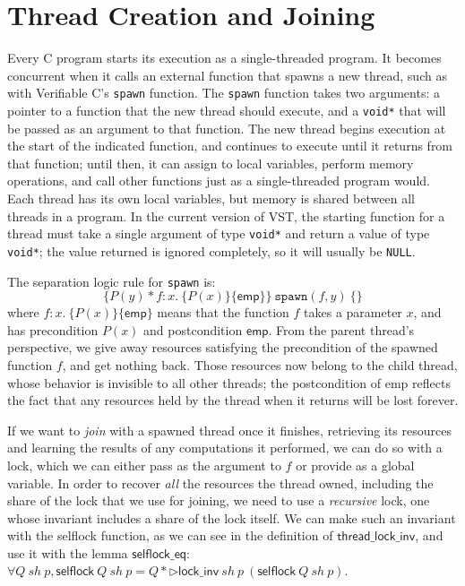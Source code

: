 \documentclass[11pt]{article} %
\begin{document}
\section{Thread Creation and Joining}
Every C program starts its execution as a single-threaded program. It becomes concurrent when it calls an external function that spawns a new thread, such as with Verifiable C's \texttt{spawn} function. The \texttt{spawn} function takes two arguments: a pointer to a function that the new thread should execute, and a \texttt{void*} that will be passed as an argument to that function. The new thread begins execution at the start of the indicated function, and continues to execute until it returns from that function; until then, it can assign to local variables, perform memory operations, and call other functions just as a single-threaded program would. Each thread has its own local variables, but memory is shared between all threads in a program. In the current version of VST, the starting function for a thread must take a single argument of type \texttt{void*} and return a value of type \texttt{void*}; the value returned is ignored completely, so it will usually be \texttt{NULL}.

The separation logic rule for \texttt{spawn} is:
$$\{P(y) * f : x.\ \{P(x)\}\{\mathsf{emp}\}\}\ \texttt{spawn}(f, y)\ \{\}$$
where $f : x.\ \{P(x)\}\{\mathsf{emp}\}$ means that the function $f$ takes a parameter $x$, and has precondition $P(x)$ and postcondition $\mathsf{emp}$. From the parent thread's perspective, we give away resources satisfying the precondition of the spawned function $f$, and get nothing back. Those resources now belong to the child thread, whose behavior is invisible to all other threads; the postcondition of \textsf{emp} reflects the fact that any resources held by the thread when it returns will be lost forever.

If we want to \emph{join} with a spawned thread once it finishes, retrieving its resources and learning the results of any computations it performed, we can do so with a lock, which we can either pass as the argument to $f$ or provide as a global variable. In order to recover \emph{all} the resources the thread owned, including the share of the lock that we use for joining, we need to use a \emph{recursive} lock, one whose invariant includes a share of the lock itself. We can make such an invariant with the \textsf{selflock} function, as we can see in the definition of $\mathsf{thread\_lock\_inv}$, and use it with the lemma $\mathsf{selflock\_eq}$: $\forall Q\ \mathit{sh}\ p, \mathsf{selflock}\ Q\ \mathit{sh}\ p = Q * \triangleright \mathsf{lock\_inv}\ \mathit{sh}\ p\ (\mathsf{selflock}\ Q\ \mathit{sh}\ p)$. 
\end{document}

